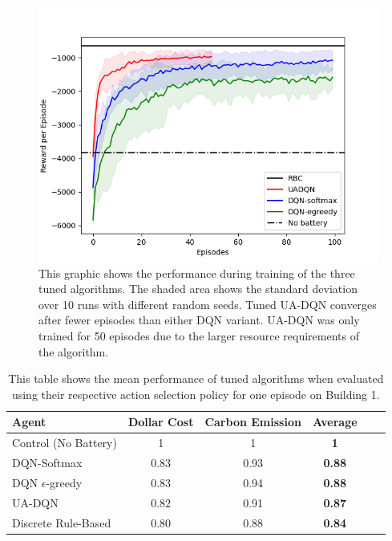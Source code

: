 \begin{figure}
  \centering
  \includegraphics[width=\figurewidth]{figures/tuning_validation.png}
  \caption{This graphic shows the performance during training of the three tuned algorithms. The shaded area shows the standard deviation over 10 runs with different random seeds. Tuned UA-DQN converges after fewer episodes than either DQN variant. UA-DQN was only trained for 50 episodes due to the larger resource requirements of the algorithm.}
  \label{fig:tuning_validation}
\end{figure}

\begin{table}
  \centering
  \caption{This table shows the mean performance of tuned algorithms when evaluated using their respective action selection policy for one episode on Building 1.}
  \label{tab:tuned_results}
  \begin{tabular}{l|ccccc}
    Agent                 & Dollar Cost & Carbon Emission & Average \\ \hline
    Control (No Battery)   & 1    & 1    & \textbf{1}    \\
    DQN-Softmax           & 0.83 & 0.93 & \textbf{0.88} \\
    DQN $\epsilon$-greedy & 0.83 & 0.94 & \textbf{0.88} \\
    UA-DQN                & 0.82 & 0.91 & \textbf{0.87} \\
    Discrete Rule-Based   & 0.80 & 0.88 & \textbf{0.84}
  \end{tabular}
\end{table}

